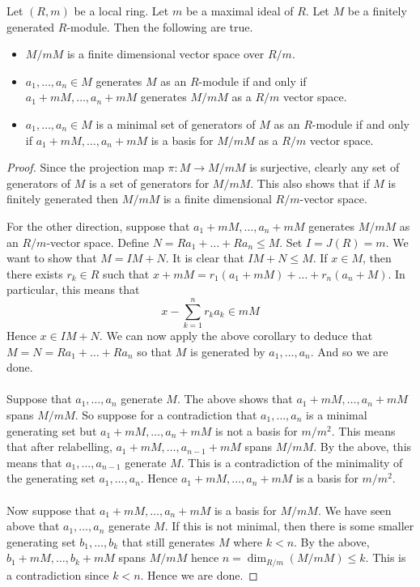 \documentclass[a4paper]{article}
\begin{document}
\begin{crl}{}{} Let $(R,m)$ be a local ring. Let $m$ be a maximal ideal of $R$. Let $M$ be a finitely generated $R$-module. Then the following are true. 
\begin{itemize}
\item $M/mM$ is a finite dimensional vector space over $R/m$. 
\item $a_1,\dots,a_n\in M$ generates $M$ as an $R$-module if and only if $a_1+mM,\dots,a_n+mM$ generates $M/mM$ as a $R/m$ vector space. 
\item $a_1,\dots,a_n\in M$ is a minimal set of generators of $M$ as an $R$-module if and only if $a_1+mM,\dots,a_n+mM$ is a basis for $M/mM$ as a $R/m$ vector space. 
\end{itemize} \tcbline
\begin{proof}
Since the projection map $\pi:M\to M/mM$ is surjective, clearly any set of generators of $M$ is a set of generators for $M/mM$. This also shows that if $M$ is finitely generated then $M/mM$ is a finite dimensional $R/m$-vector space. 

For the other direction, suppose that $a_1+mM,\dots,a_n+mM$ generates $M/mM$ as an $R/m$-vector space. Define $N=Ra_1+\dots+Ra_n\leq M$. Set $I=J(R)=m$. We want to show that $M=IM+N$. It is clear that $IM+N\leq M$. If $x\in M$, then there exists $r_k\in R$ such that $x+mM=r_1(a_1+mM)+\dots+r_n(a_n+M)$. In particular, this means that $$x-\sum_{k=1}^nr_ka_k\in mM$$ Hence $x\in IM+N$. We can now apply the above corollary to deduce that $M=N=Ra_1+\dots+Ra_n$ so that $M$ is generated by $a_1,\dots,a_n$. And so we are done. \\~\\

Suppose that $a_1,\dots,a_n$ generate $M$. The above shows that $a_1+mM,\dots,a_n+mM$ spans $M/mM$. So suppose for a contradiction that $a_1,\dots,a_n$ is a minimal generating set but $a_1+mM,\dots,a_n+mM$ is not a basis for $m/m^2$. This means that after relabelling, $a_1+mM,\dots,a_{n-1}+mM$ spans $M/mM$. By the above, this means that $a_1,\dots,a_{n-1}$ generate $M$. This is a contradiction of the minimality of the generating set $a_1,\dots,a_n$. Hence $a_1+mM,\dots,a_n+mM$ is a basis for $m/m^2$. \\~\\

Now suppose that $a_1+mM,\dots,a_n+mM$ is a basis for $M/mM$. We have seen above that $a_1,\dots,a_n$ generate $M$. If this is not minimal, then there is some smaller generating set $b_1,\dots,b_k$ that still generates $M$ where $k<n$. By the above, $b_1+mM,\dots,b_k+mM$ spans $M/mM$ hence $n=\dim_{R/m}(M/mM)\leq k$. This is a contradiction since $k<n$. Hence we are done. 
\end{proof}
\end{crl}
\end{document}
